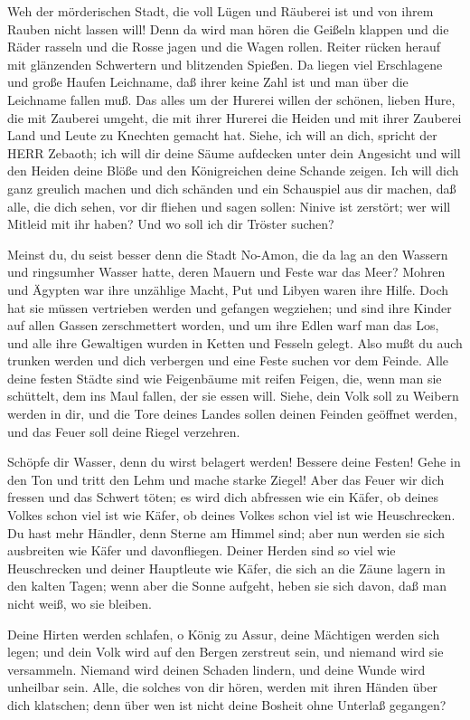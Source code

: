  Weh der mörderischen Stadt, die voll Lügen und Räuberei ist
und von ihrem Rauben nicht lassen will!  Denn da wird man
hören die Geißeln klappen und die Räder rasseln und die Rosse jagen und
die Wagen rollen.  Reiter rücken herauf mit glänzenden
Schwertern und blitzenden Spießen. Da liegen viel Erschlagene und große
Haufen Leichname, daß ihrer keine Zahl ist und man über die Leichname
fallen muß.  Das alles um der Hurerei willen der schönen,
lieben Hure, die mit Zauberei umgeht, die mit ihrer Hurerei die Heiden
und mit ihrer Zauberei Land und Leute zu Knechten gemacht hat.
 Siehe, ich will an dich, spricht der HERR Zebaoth; ich will
dir deine Säume aufdecken unter dein Angesicht und will den Heiden deine
Blöße und den Königreichen deine Schande zeigen.  Ich will
dich ganz greulich machen und dich schänden und ein Schauspiel aus dir
machen,  daß alle, die dich sehen, vor dir fliehen und sagen
sollen: Ninive ist zerstört; wer will Mitleid mit ihr haben? Und wo soll
ich dir Tröster suchen?

 Meinst du, du seist besser denn die Stadt No-Amon, die da
lag an den Wassern und ringsumher Wasser hatte, deren Mauern und Feste
war das Meer?  Mohren und Ägypten war ihre unzählige Macht,
Put und Libyen waren ihre Hilfe.  Doch hat sie müssen
vertrieben werden und gefangen wegziehen; und sind ihre Kinder auf allen
Gassen zerschmettert worden, und um ihre Edlen warf man das Los, und
alle ihre Gewaltigen wurden in Ketten und Fesseln gelegt. 
Also mußt du auch trunken werden und dich verbergen und eine Feste
suchen vor dem Feinde.  Alle deine festen Städte sind wie
Feigenbäume mit reifen Feigen, die, wenn man sie schüttelt, dem ins Maul
fallen, der sie essen will.  Siehe, dein Volk soll zu
Weibern werden in dir, und die Tore deines Landes sollen deinen Feinden
geöffnet werden, und das Feuer soll deine Riegel verzehren.

 Schöpfe dir Wasser, denn du wirst belagert werden! Bessere
deine Festen! Gehe in den Ton und tritt den Lehm und mache starke
Ziegel!  Aber das Feuer wir dich fressen und das Schwert
töten; es wird dich abfressen wie ein Käfer, ob deines Volkes schon viel
ist wie Käfer, ob deines Volkes schon viel ist wie Heuschrecken.
 Du hast mehr Händler, denn Sterne am Himmel sind; aber nun
werden sie sich ausbreiten wie Käfer und davonfliegen. 
Deiner Herden sind so viel wie Heuschrecken und deiner Hauptleute wie
Käfer, die sich an die Zäune lagern in den kalten Tagen; wenn aber die
Sonne aufgeht, heben sie sich davon, daß man nicht weiß, wo sie bleiben.

 Deine Hirten werden schlafen, o König zu Assur, deine
Mächtigen werden sich legen; und dein Volk wird auf den Bergen zerstreut
sein, und niemand wird sie versammeln.  Niemand wird deinen
Schaden lindern, und deine Wunde wird unheilbar sein. Alle, die solches
von dir hören, werden mit ihren Händen über dich klatschen; denn über
wen ist nicht deine Bosheit ohne Unterlaß gegangen?

